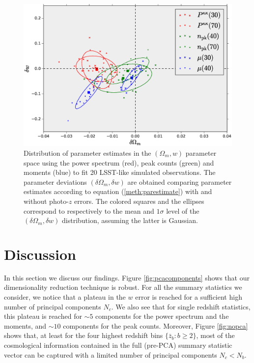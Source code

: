 \documentclass[reprint,aps,prd,superscriptaddress,showkeys,showpacs]{revtex4-1}
\begin{document}
\begin{figure}
\includegraphics[scale=0.3]{Figures/photoz_bias_Om-w.eps}
\caption{Distribution of parameter estimates in the $(\Omega_m,w)$ parameter space using the power spectrum (red), peak counts (green) and moments (blue) to fit 20 LSST-like simulated observations. The parameter deviations $(\delta\Omega_m,\delta w)$ are obtained comparing parameter estimates according to equation (\ref{meth:parestimate}) with and without photo-$z$ errors. The colored squares and the ellipses correspond to respectively to the mean and $1\sigma$ level of the $(\delta\Omega_m,\delta w)$ distribution, assuming the latter is Gaussian.}
\label{fig:photozbias}
\end{figure}


\section{Discussion}
In this section we discuss our findings. Figure \ref{fig:pcacomponents} shows that our dimensionality reduction technique is robust. For all the summary statistics we consider, we notice that a plateau in the $w$ error is reached for a sufficient high number of principal components $N_c$. We also see that for single redshift statistics, this plateau is reached for $\sim 5$ components for the power spectrum and the moments, and $\sim 10$ components for the peak counts. Moreover, Figure \ref{fig:nopca} shows that, at least for the four highest redshift bins $\{\bar{z}_b: b\geq 2\}$, most of the cosmological information contained in the full (pre-PCA) summary statistic vector can be captured with a limited number of principal components $N_c<N_b$.   
\end{document}
